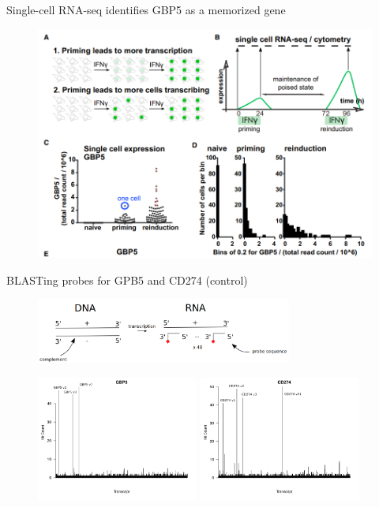 \documentclass[aspectratio=1610]{beamer}					%
\begin{document}
\begin{frame}{Single-cell RNA-seq identifies GBP5 as a memorized gene}
\begin{figure}
\includegraphics[width=12cm]{figure-3.png}
\end{figure}

\end{frame}


\begin{frame}{BLASTing probes for GPB5 and CD274 (control)}
\begin{figure}
   \includegraphics[width=0.75\textwidth]{Probe-Design.png}
\end{figure}
\begin{figure}
   \includegraphics[width=0.475\textwidth]{GBP5_Hits.png}
   \hfill
   \includegraphics[width=0.475\textwidth]{CD274_Hits.png}
\end{figure}
\end{frame}
\end{document}
